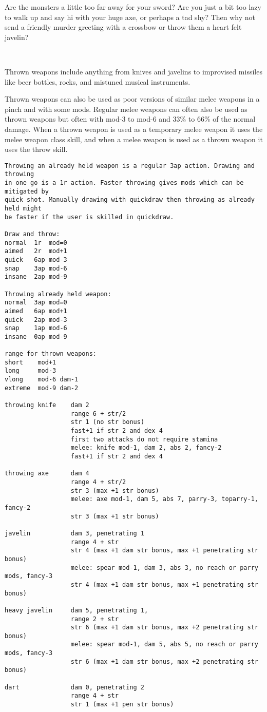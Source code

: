 Are the monsters a little too far away for your sword? Are you just a bit too lazy to walk up and say hi with your huge axe, or perhaps a tad shy? Then why not send a friendly murder greeting with a crossbow or throw them a heart felt javelin?

\

Thrown weapons include anything from knives and javelins to improvised missiles like beer bottles, rocks, and mistuned musical instruments.

Thrown weapons can also be used as poor versions of similar melee weapons in a pinch and with some mods. Regular melee weapons can often also be used as thrown weapons but often with mod-3 to mod-6 and 33\% to 66\% of the normal damage. When a thrown weapon is used as a temporary melee weapon it uses the melee weapon class skill, and when a melee weapon is used as a thrown weapon it uses the throw skill.

\small \begin{verbatim}
Throwing an already held weapon is a regular 3ap action. Drawing and throwing 
in one go is a 1r action. Faster throwing gives mods which can be mitigated by 
quick shot. Manually drawing with quickdraw then throwing as already held might 
be faster if the user is skilled in quickdraw.

Draw and throw:
normal  1r  mod=0
aimed   2r  mod+1
quick   6ap mod-3
snap    3ap mod-6
insane  2ap mod-9

Throwing already held weapon:
normal  3ap mod=0
aimed   6ap mod+1
quick   2ap mod-3
snap    1ap mod-6
insane  0ap mod-9

range for thrown weapons:
short    mod+1
long     mod-3
vlong    mod-6 dam-1
extreme  mod-9 dam-2

throwing knife    dam 2
                  range 6 + str/2
                  str 1 (no str bonus)
                  fast+1 if str 2 and dex 4
                  first two attacks do not require stamina
                  melee: knife mod-1, dam 2, abs 2, fancy-2
                  fast+1 if str 2 and dex 4

throwing axe      dam 4
                  range 4 + str/2
                  str 3 (max +1 str bonus)
                  melee: axe mod-1, dam 5, abs 7, parry-3, toparry-1, fancy-2
                  str 3 (max +1 str bonus)

javelin           dam 3, penetrating 1
                  range 4 + str
                  str 4 (max +1 dam str bonus, max +1 penetrating str bonus)
                  melee: spear mod-1, dam 3, abs 3, no reach or parry mods, fancy-3
                  str 4 (max +1 dam str bonus, max +1 penetrating str bonus)

heavy javelin     dam 5, penetrating 1,
                  range 2 + str
                  str 6 (max +1 dam str bonus, max +2 penetrating str bonus)
                  melee: spear mod-1, dam 5, abs 5, no reach or parry mods, fancy-3
                  str 6 (max +1 dam str bonus, max +2 penetrating str bonus)

dart              dam 0, penetrating 2
                  range 4 + str
                  str 1 (max +1 pen str bonus)

\end{verbatim} \pagebreak[3] \normalsize


